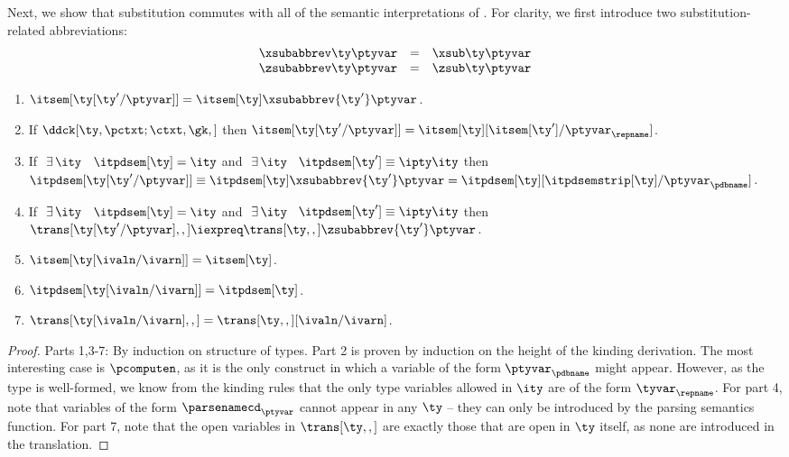 Next, we show that substitution commutes with all of the
semantic interpretations of \ddc{}. For clarity, we first introduce
two substitution-related abbreviations:
\[
\begin{array}{lll}
\xsubabbrev \ty \ptyvar & = & \xsub \ty \ptyvar\\
\zsubabbrev \ty \ptyvar & = & \zsub \ty \ptyvar
\end{array}
\]  

\begin{lemma}
  \begin{enumerate}
  \item $\itsem[{\ty[\ty'/\ptyvar]}] = \itsem[\ty]\xsubabbrev {\ty'} \ptyvar$.
  \item If $\ddck[\ty,\pctxt;\ctxt,\gk,]$ then $\itsem[{\ty[\ty'/\ptyvar]}] = 
    \itsem[\ty][\itsem[\ty']/\ptyvar_\repname]$.
  \item If $\ \exists\,\ity$ \suchthat\ $\itpdsem[\ty] = \ity$ and
    $\ \exists\,\ity$ \suchthat\ $\itpdsem[\ty'] \equiv {\ipty \ity}$
then $\itpdsem[{\ty[\ty'/\ptyvar]}] \equiv
    \itpdsem[\ty]\xsubabbrev {\ty'} \ptyvar = 
    \itpdsem[\ty][\itpdsemstrip[\ty]/\ptyvar_\pdbname]$.
  \item If $\ \exists\,\ity$ \suchthat\ $\itpdsem[\ty] = \ity$ and
    $\ \exists\,\ity$ \suchthat\ $\itpdsem[\ty'] \equiv {\ipty \ity}$
then $\trans[{\ty[\ty'/\ptyvar]},,] \iexpreq
    \trans[\ty,,]\zsubabbrev {\ty'} \ptyvar$.
  \item $\itsem[{\ty[\ivaln/\ivarn]}] = \itsem[\ty]$.
  \item $\itpdsem[{\ty[\ivaln/\ivarn]}] = \itpdsem[\ty]$.
  \item $\trans[{\ty[\ivaln/\ivarn]},,] = \trans[\ty,,][\ivaln/\ivarn]$.
  \end{enumerate}
\label{lemma:subst-comm}
\end{lemma}

\begin{proof}
  Parts 1,3-7: By induction on structure of types. 
  Part 2 is proven by induction
  on the height of the kinding derivation.  The most interesting case
  is $\pcomputen$, as it is the only construct in which a variable of
  the form $\ptyvar_\pdbname$ might appear. However, as the type is
  well-formed, we know from the kinding rules that the only type
  variables allowed in $\ity$ are of the form $\tyvar_\repname$.
  For part 4, note that variables of the form $\parsenamecd_\ptyvar$
  cannot appear in any $\ty$ -- they can only be introduced by the
  parsing semantics function. 
  For part 7, note that the open variables in $\trans[\ty,,]$ are
  exactly those that are open in $\ty$ itself, as none are introduced
  in the translation.
\end{proof}

